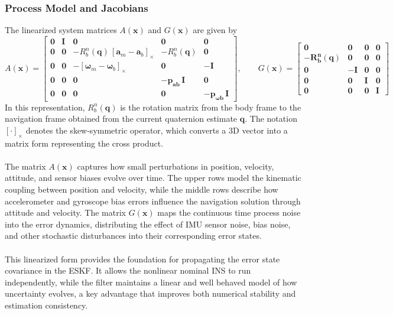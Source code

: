 \subsubsection{Process Model and Jacobians}
The linearized system matrices $A(\mathbf{x})$ and $G(\mathbf{x})$ are given by
$$
    A(\mathbf{x}) =
    \begin{bmatrix}
        \mathbf{0} & \mathbf{I} & \mathbf{0} & \mathbf{0} & \mathbf{0} \\
        \mathbf{0} & \mathbf{0} & -R_b^n(\mathbf{q})\,[\mathbf{a}_m - \mathbf{a}_{b}]_\times & -R_b^n(\mathbf{q}) & \mathbf{0} \\
        \mathbf{0} & \mathbf{0} & -[\boldsymbol{\omega}_m - \mathbf{\omega}_b]_\times & \mathbf{0} & -\mathbf{I} \\
        \mathbf{0} & \mathbf{0} & \mathbf{0} & \mathbf{-p_{\mathbf{a}b}\,I} & \mathbf{0} \\
        \mathbf{0} & \mathbf{0} & \mathbf{0} & \mathbf{0} & \mathbf{-p_{\mathbf{\omega}b}\,I}
    \end{bmatrix},
    \qquad
    G(\mathbf{x}) =
    \begin{bmatrix}
        \mathbf{0} & \mathbf{0} & \mathbf{0} & \mathbf{0} \\
        \mathbf{-R_b^n(\mathbf{q})} & \mathbf{0} & \mathbf{0} & \mathbf{0} \\
        \mathbf{0} & \mathbf{-I} & \mathbf{0} & \mathbf{0} \\
        \mathbf{0} & \mathbf{0} & \mathbf{I} & \mathbf{0} \\
        \mathbf{0} & \mathbf{0} & \mathbf{0} & \mathbf{I}
    \end{bmatrix}
$$
In this representation, $R_b^n(\mathbf{q})$ is the rotation matrix from the body frame to the navigation frame obtained from the current quaternion estimate $\mathbf{q}$. The notation $[\cdot]_\times$ denotes the skew-symmetric operator, which converts a 3D vector into a matrix form representing the cross product.  
\\ \\
The matrix $A(\mathbf{x})$ captures how small perturbations in position, velocity, attitude, and sensor biases evolve over time. The upper rows model the kinematic coupling between position and velocity, while the middle rows describe how accelerometer and gyroscope bias errors influence the navigation solution through attitude and velocity. The matrix $G(\mathbf{x})$ maps the continuous time process noise into the error dynamics, distributing the effect of IMU sensor noise, bias noise, and other stochastic disturbances into their corresponding error states.  
\\ \\
This linearized form provides the foundation for propagating the error state covariance in the ESKF. It allows the nonlinear nominal INS to run independently, while the filter maintains a linear and well behaved model of how uncertainty evolves, a key advantage that improves both numerical stability and estimation consistency.



